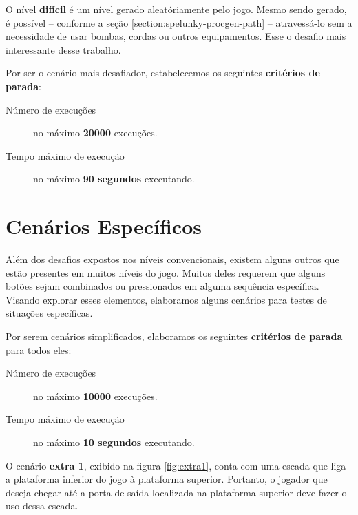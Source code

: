 O nível \textbf{difícil} é um nível gerado aleatóriamente pelo jogo. Mesmo
sendo gerado, é possível -- conforme a seção
\ref{section:spelunky-procgen-path} -- atravessá-lo sem a necessidade de usar
bombas, cordas ou outros equipamentos. Esse o desafio mais interessante desse
trabalho.

Por ser o cenário mais desafiador, estabelecemos os seguintes \textbf{critérios
de parada}:

\begin{description}
    \item [Número de execuções] no máximo \textbf{20000} execuções.
    \item [Tempo máximo de execução] no máximo \textbf{90 segundos} executando.
\end{description}

\section{Cenários Específicos}

Além dos desafios expostos nos níveis convencionais, existem alguns outros que
estão presentes em muitos níveis do jogo. Muitos deles requerem que alguns
botões sejam combinados ou pressionados em alguma sequência específica. Visando
explorar esses elementos, elaboramos alguns cenários para testes de situações
específicas.

Por serem cenários simplificados, elaboramos os seguintes \textbf{critérios de
parada} para todos eles:

\begin{description}
    \item [Número de execuções] no máximo \textbf{10000} execuções.
    \item [Tempo máximo de execução] no máximo \textbf{10 segundos} executando.
\end{description}

O cenário \textbf{extra 1}, exibido na figura \ref{fig:extra1}, conta com uma
escada que liga a plataforma inferior do jogo à plataforma superior. Portanto,
o jogador que deseja chegar até a porta de saída localizada na plataforma
superior deve fazer o uso dessa escada.

